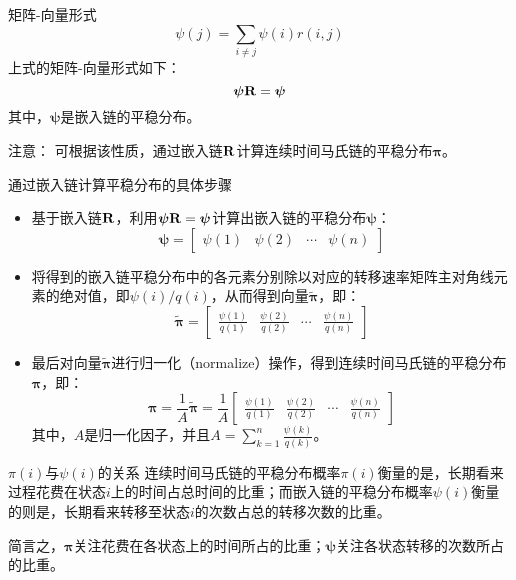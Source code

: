 \documentclass[t]{beamer}
\begin{document}
\begin{frame}{矩阵-向量形式}
\[\psi(j)=\sum_{i\ne j} \psi(i)r(i,j)
\]
上式的矩阵-向量形式如下：
  \begin{equation*}
\bm{\psi}{\bf R}=\bm{\psi}
\end{equation*}
其中，$\bm{\psi}$是嵌入链的平稳分布。

\begin{block}{注意：}
  可根据该性质，通过嵌入链${\bf R}$计算连续时间马氏链的平稳分布$\bm{\pi}$。
\end{block}

\end{frame}


\begin{frame}{通过嵌入链计算平稳分布的具体步骤}\small
  \begin{itemize}
    \item 基于嵌入链$\bf R$，利用$\bm{\psi}{\bf R}=\bm{\psi}$计算出嵌入链的平稳分布$\bm{\psi}$：
	$$\bm{\psi}=\begin{bmatrix}
	\psi(1) & \psi(2) & \cdots & \psi(n)
  \end{bmatrix}$$
  \item 将得到的嵌入链平稳分布中的各元素分别除以对应的转移速率矩阵主对角线元素的绝对值，即$\psi(i)/q(i)$，从而得到向量$\widetilde{\bm{\pi}}$，即：
	\[\widetilde{\bm{\pi}}=\begin{bmatrix}
		\frac{\psi(1)}{q(1)} & \frac{\psi(2)}{q(2)} & \cdots & \frac{\psi(n)}{q(n)}
	\end{bmatrix} \]

  \item 最后对向量$\widetilde{\bm{\pi}}$进行归一化（normalize）操作，得到连续时间马氏链的平稳分布$\bm{\pi}$，即：
	\[\bm{\pi}=\frac{1}{A}\widetilde{\bm{\pi}}=\frac{1}{A}\begin{bmatrix}
		\frac{\psi(1)}{q(1)} & \frac{\psi(2)}{q(2)} & \cdots & \frac{\psi(n)}{q(n)}
	\end{bmatrix} \]	
	其中，$A$是归一化因子，并且$A=\sum_{k=1}^{n}\frac{\psi(k)}{q(k)}$。

  \end{itemize}

\end{frame}


\begin{frame}{$\pi(i)$与$\psi(i)$的关系}
  连续时间马氏链的平稳分布概率$\pi(i)$衡量的是，长期看来过程花费在状态$i$上的时间占总时间的比重；而嵌入链的平稳分布概率$\psi(i)$衡量的则是，长期看来转移至状态$i$的次数占总的转移次数的比重。
  
  简言之，$\bm{\pi}$关注花费在各状态上的时间所占的比重；$\bm{\psi}$关注各状态转移的次数所占的比重。
\end{frame}
\end{document}
